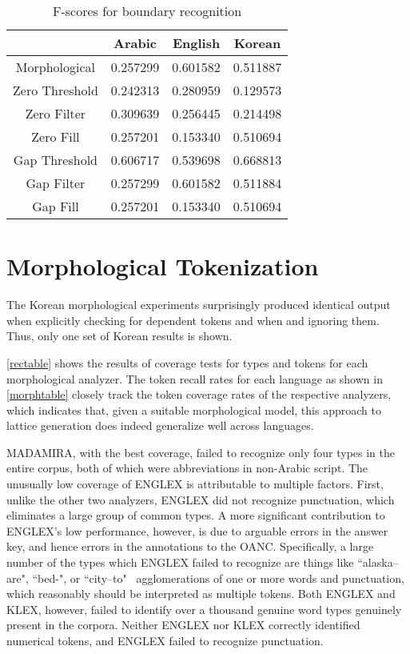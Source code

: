 \begin{table}
	\centering
	\begin{tabular}{ | c | c | c | c |}
		\cline{2-4}
		\multicolumn{1}{c|}{} & Arabic & English & Korean \\ \hline
		Morphological & 0.257299 & 0.601582 & 0.511887 \\ \hline \hline
		Zero Threshold & 0.242313 & 0.280959 & 0.129573 \\ \hline
		Zero Filter & 0.309639 & 0.256445 & 0.214498 \\ \hline
		Zero Fill & 0.257201 & 0.153340 & 0.510694 \\ \hline \hline
		Gap Threshold & 0.606717 & 0.539698 & 0.668813 \\ \hline
		Gap Filter & 0.257299 & 0.601582 & 0.511884 \\ \hline
		Gap Fill & 0.257201 & 0.153340 & 0.510694 \\ \hline
	\end{tabular}
	\caption{F-scores for boundary recognition}
	\label{bsumtable}
\end{table}
\FloatBarrier

\section{Morphological Tokenization}
\FloatBarrier

The Korean morphological experiments surprisingly produced identical output when explicitly checking for dependent tokens and when and ignoring them. Thus, only one set of Korean results is shown.

\ref{rectable} shows the results of coverage tests for types and tokens for each morphological analyzer. The token recall rates for each language as shown in \ref{morphtable} closely track the token coverage rates of the respective analyzers, which indicates that, given a suitable morphological model, this approach to lattice generation does indeed generalize well across languages.

MADAMIRA, with the best coverage, failed to recognize only four types in the entire corpus, both of which were abbreviations in non-Arabic script. The unusually low coverage of ENGLEX is attributable to multiple factors. First, unlike the other two analyzers, ENGLEX did not recognize punctuation, which eliminates a large group of common types. A more significant contribution to ENGLEX's low performance, however, is due to arguable errors in the answer key, and hence errors in the annotations to the OANC. Specifically, a large number of the types which ENGLEX failed to recognize are things like ``alaska--are", ``bed-", or ``city--to"\textemdash~ agglomerations of one or more words and punctuation, which reasonably should be interpreted as multiple tokens. Both ENGLEX and KLEX, however, failed to identify over a thousand genuine word types genuinely present in the corpora. Neither ENGLEX nor KLEX correctly identified numerical tokens, and ENGLEX failed to recognize punctuation.

